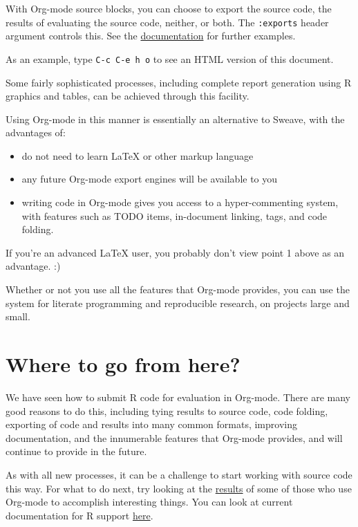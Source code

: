 \documentclass[11pt]{article}
\begin{document}
With Org-mode source blocks, you can choose to export the source code, the results of evaluating the source code, neither, or both. The \texttt{:exports} header argument controls this. See the \href{http://orgmode.org/manual/Exporting-code-blocks.html#Exporting-code-blocks}{documentation} for further examples. 

As an example, type \texttt{C-c C-e h o} to see an HTML version of this document.

Some fairly sophisticated processes, including complete report generation using R graphics and tables, can be achieved through this facility.

Using Org-mode in this manner is essentially an alternative to Sweave, with the advantages of:
\begin{itemize}
\item do not need to learn \LaTeX{} or other markup language
\item any future Org-mode export engines will be available to you
\item writing code in Org-mode gives you access to a hyper-commenting system, with features such as TODO items, in-document linking, tags, and code folding.
\end{itemize}

If you're an advanced \LaTeX{} user, you probably don't view point 1 above as an advantage. :) 

Whether or not you use all the features that Org-mode provides, you can use the system for literate programming and reproducible research, on projects large and small.
\section*{Where to go from here?}
\label{sec-10}

We have seen how to submit R code for evaluation in Org-mode. There are many good reasons to do this, including tying results to source code, code folding, exporting of code and results into many common formats, improving documentation, and the innumerable features that Org-mode provides, and will continue to provide in the future. 

As with all new processes, it can be a challenge to start working with source code this way.  For what to do next, try looking at the \href{http://orgmode.org/worg/org-contrib/babel/uses.php}{results} of some of those who use Org-mode to accomplish interesting things. You can look at current documentation for R support \href{http://orgmode.org/worg/org-contrib/babel/languages/ob-doc-R.html}{here}.
\end{document}
